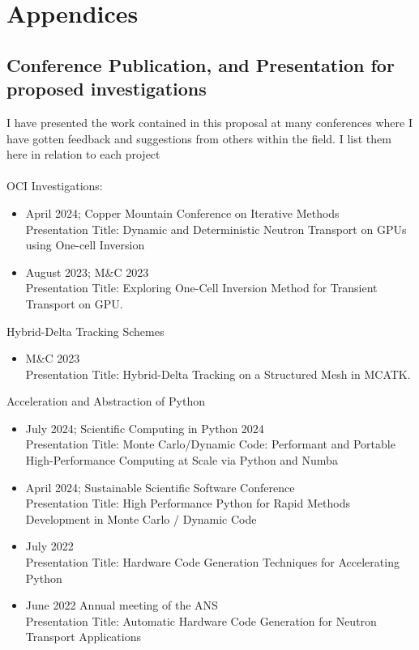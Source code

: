 \chapter{Appendices} \label{appA}

\section{Conference Publication, and Presentation for proposed investigations}
I have presented the work contained in this proposal at many conferences where I have gotten feedback and suggestions from others within the field. I list them here in relation to each project\\
\\
OCI Investigations:
\begin{itemize}
    \item April 2024; Copper Mountain Conference on Iterative Methods\\
    Presentation Title: Dynamic and Deterministic Neutron Transport on GPUs using One-cell Inversion
    \item August 2023; M\&C 2023\\
    Presentation Title: Exploring One-Cell Inversion Method for Transient Transport on GPU.
\end{itemize}
Hybrid-Delta Tracking Schemes
\begin{itemize}
    \item M\&C 2023\\
    Presentation Title: Hybrid-Delta Tracking on a Structured Mesh in MCATK.
\end{itemize}
Acceleration and Abstraction of Python
\begin{itemize}
    \item July 2024; Scientific Computing in Python 2024\\
    Presentation Title: Monte Carlo/Dynamic Code: Performant and Portable High-Performance Computing at Scale via Python and Numba 
    \item April 2024; Sustainable Scientific Software Conference\\
    Presentation Title: High Performance Python for Rapid Methods Development in Monte Carlo / Dynamic Code
    \item July 2022\\
    Presentation Title: Hardware Code Generation Techniques for Accelerating Python
    \item June 2022 Annual meeting of the ANS\\
    Presentation Title: Automatic Hardware Code Generation for Neutron Transport Applications
\end{itemize}


